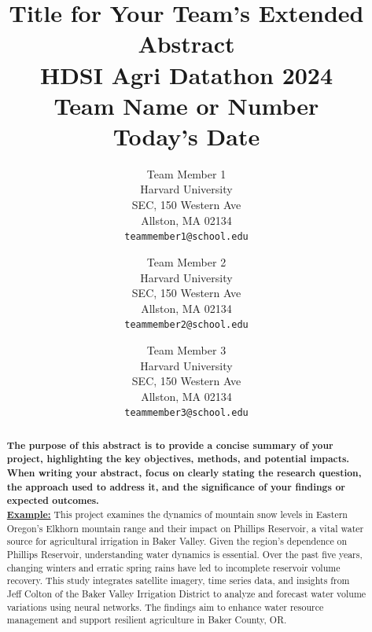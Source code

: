\documentclass[10pt,twocolumn,letterpaper]{article}
\begin{document}
\title{Title for Your Team's Extended Abstract\\
\large\normalfont HDSI Agri Datathon 2024\\
Team Name or Number\\
Today's Date\\}

\author{Team Member 1\\
Harvard University\\
SEC, 150 Western Ave\\
Allston, MA 02134 \\
{\tt\small teammember1@school.edu}
\and
Team Member 2\\
Harvard University\\
SEC, 150 Western Ave\\
Allston, MA 02134 \\
{\tt\small teammember2@school.edu}
\and
Team Member 3\\
Harvard University\\
SEC, 150 Western Ave\\
Allston, MA 02134 \\
{\tt\small teammember3@school.edu}
}

\maketitle

\begin{abstract}
\textbf{The purpose of this abstract is to provide a concise summary of your project, highlighting the key objectives, methods, and potential impacts. When writing your abstract, focus on clearly stating the research question, the approach used to address it, and the significance of your findings or expected outcomes.}\\
\underline{\textbf{Example:}} This project examines the dynamics of mountain snow levels in Eastern Oregon's Elkhorn mountain range and their impact on Phillips Reservoir, a vital water source for agricultural irrigation in Baker Valley. Given the region's dependence on Phillips Reservoir, understanding water dynamics is essential. Over the past five years, changing winters and erratic spring rains have led to incomplete reservoir volume recovery. This study integrates satellite imagery, time series data, and insights from Jeff Colton of the Baker Valley Irrigation District to analyze and forecast water volume variations using neural networks. The findings aim to enhance water resource management and support resilient agriculture in Baker County, OR.
\end{abstract}
\end{document}
